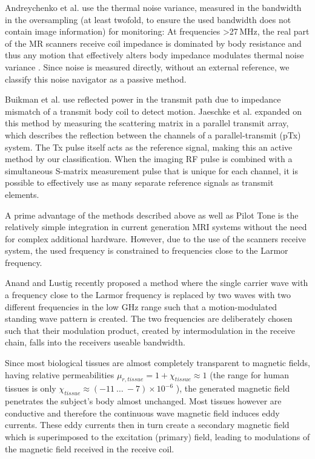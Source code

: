 \documentclass[
]{article}
\begin{document}
Andreychenko et al. \cite{Andreychenko2017ThermalSensor, Navest2019UnderstandingNavigator} use the thermal noise variance,
measured in the bandwidth in the oversampling (at least twofold, to
ensure the used bandwidth does not contain image information) for
monitoring: At frequencies \textgreater27\,MHz, the real part of the MR
scanners receive coil impedance is dominated by body resistance and thus
any motion that effectively alters body impedance modulates thermal
noise variance \cite{Andreychenko2017ThermalSensor}. Since noise is measured directly, without an
external reference, we classify this noise navigator as a passive
method.

Buikman et al. \cite{Buikman1988TheImaging} use reflected power in the transmit path due to
impedance mismatch of a transmit body coil to detect motion. Jaeschke et
al. \cite{Jaeschke2018Cardiac7T, Jaeschke2017, Jaeschke2017a, Jaeschke2019ScatteringMonitoring} expanded on this method by measuring the scattering
matrix in a parallel transmit array, which describes the reflection
between the channels of a parallel-transmit (pTx) system. The Tx pulse
itself acts as the reference signal, making this an active method by our
classification. When the imaging RF pulse is combined with a
simultaneous S-matrix measurement pulse that is unique for each channel,
it is possible to effectively use as many separate reference signals as
transmit elements.

A prime advantage of the methods described above as well as Pilot Tone
is the relatively simple integration in current generation MRI systems
without the need for complex additional hardware. However, due to the
use of the scanners receive system, the used frequency is constrained to
frequencies close to the Larmor frequency.

Anand and Lustig \cite{Anand2021BeatNavigators, Anand2024BeatFrequencies} recently proposed a method where the
single carrier wave with a frequency close to the Larmor frequency is
replaced by two waves with two different frequencies in the low GHz
range such that a motion-modulated standing wave pattern is created. The
two frequencies are deliberately chosen such that their modulation
product, created by intermodulation in the receive chain, falls into the
receivers useable bandwidth.

Since most biological tissues are almost completely transparent to
magnetic fields, having relative permeabilities
$\mu_{r,tissue} = 1 + \chi_{tissue} \approx 1$
(the range for human tissues is only $\chi_{tissue} \approx ( - 11\ \ldots\  - 7) \times 10^{- 6}$
\cite{HasgallITIS2018}), the generated magnetic field penetrates the subject's body
almost unchanged. Most tissues however are conductive and therefore the
continuous wave magnetic field induces eddy currents. These eddy
currents then in turn create a secondary magnetic field which is
superimposed to the excitation (primary) field, leading to modulations
of the magnetic field received in the receive coil.
\end{document}
